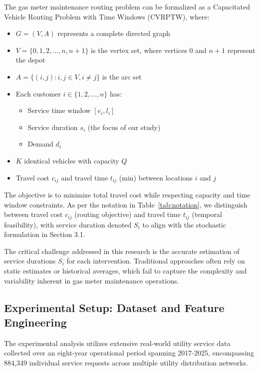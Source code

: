 \documentclass[preprint,12pt]{elsarticle}
\begin{document}
The gas meter maintenance routing problem can be formalized as a Capacitated Vehicle Routing Problem with Time Windows (CVRPTW), where:

\begin{itemize}
    \item $G = (V, A)$ represents a complete directed graph
    \item $V = \{0, 1, 2, \ldots, n, n+1\}$ is the vertex set, where vertices $0$ and $n+1$ represent the depot
    \item $A = \{(i,j) : i, j \in V, i \neq j\}$ is the arc set
    \item Each customer $i \in \{1, 2, \ldots, n\}$ has:
        \begin{itemize}
            \item Service time window $[e_i, l_i]$
            \item Service duration $s_i$ (the focus of our study)
            \item Demand $d_i$
        \end{itemize}
    \item $K$ identical vehicles with capacity $Q$
    \item Travel cost $c_{ij}$ and travel time $t_{ij}$ (min) between locations $i$ and $j$
\end{itemize}

The objective is to minimize total travel cost while respecting capacity and time window constraints. As per the notation in Table~\ref{tab:notation}, we distinguish between travel cost $c_{ij}$ (routing objective) and travel time $t_{ij}$ (temporal feasibility), with service duration denoted $S_i$ to align with the stochastic formulation in Section 3.1.

The critical challenge addressed in this research is the accurate estimation of service durations $S_i$ for each intervention. Traditional approaches often rely on static estimates or historical averages, which fail to capture the complexity and variability inherent in gas meter maintenance operations.

\subsection{Experimental Setup: Dataset and Feature Engineering}


The experimental analysis utilizes extensive real-world utility service data collected over an eight-year operational period spanning 2017-2025, encompassing 884,349 individual service requests across multiple utility distribution networks.
\end{document}
